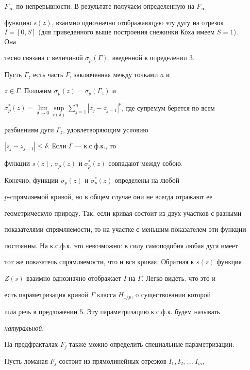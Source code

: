 $F_\infty$ по непрерывности. В результате получаем определенную на $F_\infty$


функцию $s(z)$, взаимно однозначно отображающую эту дугу на отрезок $I =


[0,S]$ (для приведенного выше построения снежинки Коха имеем $S=1$). Она


тесно связана с величиной $\sigma_{p}(\Gamma)$, введенной в определении 3.


Пусть $\Gamma_z$ есть часть $\Gamma$, заключенная между точками $a$ и


$z\in\Gamma$. Положим $\sigma_{p}(z) = \sigma_{p}(\Gamma_z)$ и


$\sigma^{*}_{p}(z) = \lim\limits_{\delta\to 0}\sup\limits_{\tau(\delta)}


\sum\limits_{j=1}^{n}| z_{j} - z_{j-1}|^p$, где супремум берется по всем


разбиениям дуги $\Gamma_z$, удовлетворяющим условию


$| z_{j} - z_{j-1}|\le\delta$. Если $\Gamma$ --- к.с.ф.к., то


функции $s(z)$, $\sigma_{p}(z)$ и $\sigma^{*}_{p}(z)$ совпадают между собою.


Конечно, функции $\sigma_{p}(z)$ и $\sigma^{*}_{p}(z)$ определены на любой


$p$-спрямляемой кривой, но в общем случае они не всегда отражают ее


геометрическую природу. Так, если кривая состоит из двух участков с разными


показателями спрямляемости, то на участке с меньшим показателем эти функции


постоянны. На к.с.ф.к. это невозможно: в силу самоподобия любая дуга имеет


тот же показатель спрямляемости, что и вся кривая. Обратная к $s(z)$ функция


$Z(s)$ взаимно однозначно отображает $I$ на $\Gamma$. Легко видеть, что это и


есть параметризация кривой $\Gamma$ класса $H_{1/p}$, о существовании которой


шла речь в предложении 5. Эту параметризацию к.с.ф.к. будем называть


{\it натуральной}.





На предфракталах $F_j$ также можно определить специальные параметризации.


Пусть ломаная $F_j$ состоит из прямолинейных отрезков $I_1,I_2,\dotsc,I_m$,


